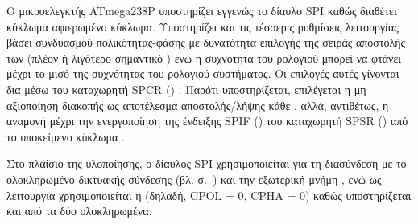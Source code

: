 Ο μικροελεγκτής ATmega238P υποστηρίζει εγγενώς το δίαυλο SPI καθώς διαθέτει
κύκλωμα αφιερωμένο κύκλωμα. Υποστηρίζει και τις τέσσερις ρυθμίσεις λειτουργίας
βάσει συνδυασμού πολικότητας-φάσης με δυνατότητα επιλογής της σειράς αποστολής
των  (πλέον ή λιγότερο σημαντικό ) ενώ η συχνότητα του ρολογιού
μπορεί να φτάνει μέχρι το μισό της συχνότητας του ρολογιού συστήματος. Οι
επιλογές αυτές γίνονται δια μέσω του καταχωρητή SPCR ()
\parencite[169]{atmel13}. Παρότι υποστηρίζεται, επιλέγεται η μη αξιοποίηση
διακοπής ως αποτέλεσμα αποστολής\slash{}λήψης κάθε , αλλά, αντιθέτως, η
αναμονή μέχρι την ενεργοποίηση της ένδειξης SPIF () του
καταχωρητή SPSR () από το υποκείμενο κύκλωμα
\parencite[167,170]{atmel13}.

Στο πλαίσιο της υλοποίησης, ο δίαυλος SPI χρησιμοποιείται για τη διασύνδεση με
το ολοκληρωμένο δικτυακής σύνδεσης (βλ. 
σ.~\pageref{sec:w5100}) και την εξωτερική μνήμη ,
ενώ ως λειτουργία χρησιμοποιείται η  (δηλαδή, CPOL = 0, CPHA = 0)
καθώς υποστηρίζεται και από τα δύο ολοκληρωμένα.
